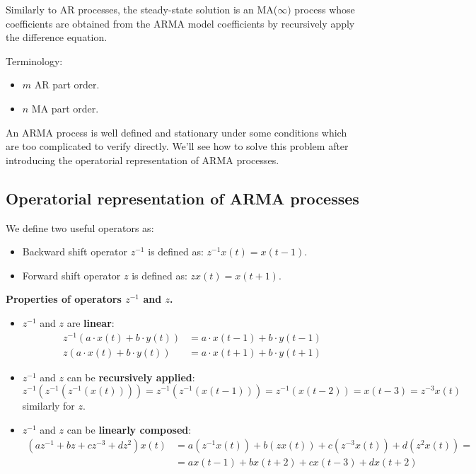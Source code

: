 Similarly to AR processes, the steady-state solution is an MA($\infty)$ process whose coefficients are obtained from the ARMA model coefficients by recursively apply the difference equation.
 
Terminology:
\begin{itemize}
	\item $m$ AR part order.
	\item $n$ MA part order.
\end{itemize}

An ARMA process is well defined and stationary under some conditions which are too complicated to verify directly.
We'll see how to solve this problem after introducing the operatorial representation of ARMA processes.

\subsection{Operatorial representation of ARMA processes}

\begin{defn}
	We define two useful operators as:
	\begin{itemize}
		\item Backward shift operator $z^{-1}$ is defined as: $z^{-1} x(t)=x(t-1)$.
		\item Forward shift operator $z$ is defined as: $z x(t)=x(t+1)$.	
	\end{itemize}
	
\end{defn}

\textbf{Properties of operators $z^{-1}$ and $z$.}

\begin{itemize}
	\item $z^{-1}$ and $z$ are \textbf{linear}:
		\begin{align*}
			z^{-1}(a \cdot x(t)+b \cdot y(t))&=a \cdot x(t-1)+b \cdot y(t-1) \\
			z(a \cdot x(t)+b \cdot y(t))&=a \cdot x(t+1)+b \cdot y(t+1)
		\end{align*}
	\item $z^{-1}$ and $z$ can be \textbf{recursively applied}:
		\[
			z^{-1}(z^{-1}(z^{-1}(x(t))))=z^{-1}(z^{-1}(x(t-1)))=z^{-1}(x(t-2))=x(t-3)=z^{-3} x(t)
		\]
		similarly for $z$.
	\item $z^{-1}$ and $z$ can be \textbf{linearly composed}:
		\begin{align*}
			(a z^{-1}+b z+c z^{-3}+d z^{2}) x(t)&=a(z^{-1} x(t))+b(z x(t))+c(z^{-3} x(t))+d(z^{2} x(t))= \\
			&=a x(t-1)+b x(t+2)+c x(t-3)+d x(t+2)
		\end{align*}
\end{itemize}

